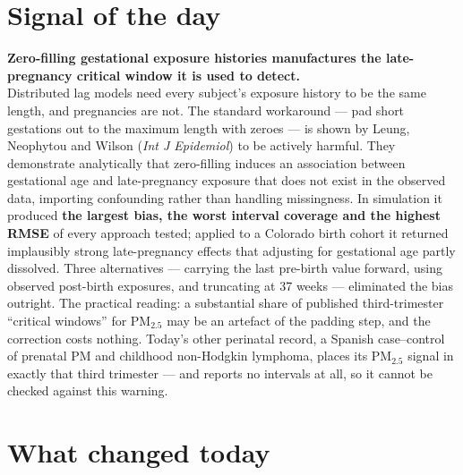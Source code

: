 \documentclass[10pt]{article}
\begin{document}
\vspace{6mm}

\section*{\sffamily\bfseries\color{Deep}Signal of the day}
\vspace{-1.5mm}{\color{Amber}\rule{\linewidth}{1.1pt}}\vspace{2.5mm}

\begin{keybox}
{\sffamily\bfseries\small\color{Deep}Zero-filling gestational exposure histories manufactures
the late-pregnancy critical window it is used to detect.}\\[1.4mm]
\footnotesize
Distributed lag models need every subject's exposure history to be the same length, and
pregnancies are not. The standard workaround --- pad short gestations out to the maximum
length with zeroes --- is shown by Leung, Neophytou and Wilson (\textit{Int J Epidemiol})
to be actively harmful. They demonstrate analytically that zero-filling induces an
association between gestational age and late-pregnancy exposure that does not exist in
the observed data, importing confounding rather than handling missingness. In simulation
it produced \textbf{the largest bias, the worst interval coverage and the highest RMSE}
of every approach tested; applied to a Colorado birth cohort it returned implausibly
strong late-pregnancy effects that adjusting for gestational age partly dissolved. Three
alternatives --- carrying the last pre-birth value forward, using observed post-birth
exposures, and truncating at 37 weeks --- eliminated the bias outright. The practical
reading: a substantial share of published third-trimester ``critical windows'' for
PM$_{2.5}$ may be an artefact of the padding step, and the correction costs nothing.
Today's other perinatal record, a Spanish case--control of prenatal PM and childhood
non-Hodgkin lymphoma, places its PM$_{2.5}$ signal in exactly that third trimester ---
and reports no intervals at all, so it cannot be checked against this warning.
\end{keybox}

\vspace{3mm}

\section*{\sffamily\bfseries\color{Deep}What changed today}
\vspace{-1.5mm}{\color{Amber}\rule{\linewidth}{1.1pt}}\vspace{2.5mm}
\end{document}
